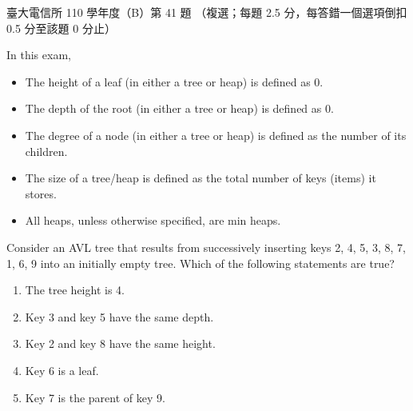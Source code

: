 \begin{pastexam}[label={px:ntu-110-comm-dsa-41}]{臺大電信所 110 學年度（B）第 41 題}
（複選；每題 2.5 分，每答錯一個選項倒扣 0.5 分至該題 0 分止）

In this exam,
\begin{itemize}
\item The height of a leaf (in either a tree or heap) is defined as 0.
\item The depth of the root (in either a tree or heap) is defined as 0.
\item The degree of a node (in either a tree or heap) is defined as the number of its children.
\item The size of a tree/heap is defined as the total number of keys (items) it stores.
\item All heaps, unless otherwise specified, are min heaps.
\end{itemize}

Consider an AVL tree that results from successively inserting keys 2, 4, 5, 3, 8, 7, 1, 6, 9 into an initially empty tree. Which of the following statements are true?
\begin{enumerate}[label=\Alph*.]
\item The tree height is 4.
\item Key 3 and key 5 have the same depth.
\item Key 2 and key 8 have the same height.
\item Key 6 is a leaf.
\item Key 7 is the parent of key 9.
\end{enumerate}
\end{pastexam}

